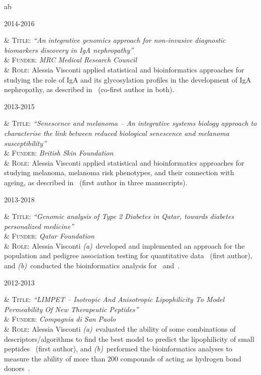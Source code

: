 \documentclass[a4paper,10pt]{article}
\newenvironment{singletablelist}
{	\vspace{-0.2cm}
	\begin{longtable}[!h]{ab}}{\end{longtable}
}
\newcommand{\stlist}[2]{
	\hspace{-3cm}
	\noindent
	\begin{minipage}{0.24\textwidth}
	\begin{flushright}
	\textsc{#1}
	\end{flushright}
	\end{minipage}
	& #2\\[0.2cm]
}
\begin{document}
\newpage

\begin{singletablelist}

	\stlist{2014-2016}{  
		\textsc{Title:} \emph{``An integrative genomics approach for non-invasive diagnostic biomarkers discovery in IgA nephropathy''}\\
		& \textsc{Funder:} \emph{MRC Medical Research Council}\\
		& \textsc{Role:} Alessia Visconti applied statistical and bioinformatics approaches for studying the role of IgA and its glycosylation profiles in the development of IgA nephropathy, as described in~\cite{Lom16,Dot21} (co-first author in both).}
	
	\stlist{2013-2015}{ 
		\textsc{Title:} \emph{``Senescence and melanoma -- An integrative systems biology approach to characterise the link between reduced biological senescence and melanoma susceptibility''}\\
		& \textsc{Funder:} \emph{British Skin Foundation}\\
		& \textsc{Role:} Alessia Visconti applied statistical and bioinformatics approaches for studying melanoma, melanoma risk phenotypes, and their connection with ageing, as described in~\cite{Rib16,Hys18,Vis18a,Duf17,Vis19a,Vis20,San20} (first author in three manuscripts).}
				
	\stlist{2013-2018}{ 
		\textsc{Title:} \emph{``Genomic analysis of Type 2 Diabetes in Qatar, towards diabetes personalized medicine''}\\
		& \textsc{Funder:} \emph{Qatar Foundation}\\
		& \textsc{Role:} Alessia Visconti \emph{(a)}~developed and implemented an approach for the population and pedigree association testing for quantitative data~\cite{Vis16} (first author), and \emph{(b)}~conducted the bioinformatics analysis for~\cite{AlM15} and~\cite{Zag18}.}
	
	\stlist{2012-2013}{
		\textsc{Title:} \emph{``LIMPET -- Isotropic And Anisotropic Lipophilicity To Model Permeability Of New Therapeutic Peptides''}\\
		& \textsc{Funder:} \emph{Compagnia di San Paolo}\\
		& \textsc{Role:} Alessia Visconti \emph{(a)}~evaluated the ability of some combinations of descriptors/algorithms to find the best model to predict the lipophilicity of small peptides~\cite{Vis15a} (first author), and \emph{(b)}~performed the bioinformatics analyses to measure the ability of more than 200 compounds of acting as hydrogen bond donors~\cite{Erm14}.}	


\end{singletablelist}
\end{document}
